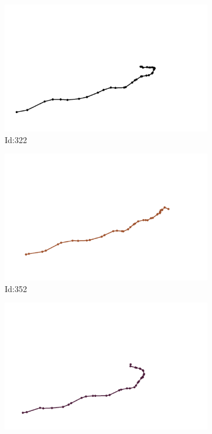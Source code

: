 \documentclass[12pt,twoside]{report}
\begin{document}
\begin{figure}
\centering
\begin{subfigure}[b]{0.20\textwidth}
\centering
\includegraphics[width=\textwidth]{../../trajectories/322.png}
\caption{Id:322}
\end{subfigure}
\begin{subfigure}[b]{0.20\textwidth}
\centering
\includegraphics[width=\textwidth]{../../trajectories/352.png}
\caption{Id:352}
\end{subfigure}
\begin{subfigure}[b]{0.20\textwidth}
\centering
\includegraphics[width=\textwidth]{../../trajectories/386.png}

\end{subfigure}
\end{figure}
\end{document}
